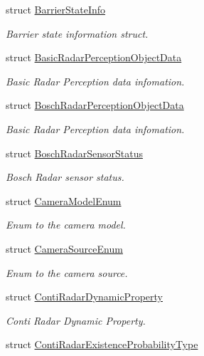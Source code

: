 \begin{DoxyCompactItemize}
struct \hyperlink{structmaf__perception__interface_1_1BarrierStateInfo}{Barrier\+State\+Info}
\begin{DoxyCompactList}\small\item\em Barrier state information struct. \end{DoxyCompactList}\item 
struct \hyperlink{structmaf__perception__interface_1_1BasicRadarPerceptionObjectData}{Basic\+Radar\+Perception\+Object\+Data}
\begin{DoxyCompactList}\small\item\em Basic Radar Perception data infomation. \end{DoxyCompactList}\item 
struct \hyperlink{structmaf__perception__interface_1_1BoschRadarPerceptionObjectData}{Bosch\+Radar\+Perception\+Object\+Data}
\begin{DoxyCompactList}\small\item\em Basic Radar Perception data infomation. \end{DoxyCompactList}\item 
struct \hyperlink{structmaf__perception__interface_1_1BoschRadarSensorStatus}{Bosch\+Radar\+Sensor\+Status}
\begin{DoxyCompactList}\small\item\em Bosch Radar sensor status. \end{DoxyCompactList}\item 
struct \hyperlink{structmaf__perception__interface_1_1CameraModelEnum}{Camera\+Model\+Enum}
\begin{DoxyCompactList}\small\item\em Enum to the camera model. \end{DoxyCompactList}\item 
struct \hyperlink{structmaf__perception__interface_1_1CameraSourceEnum}{Camera\+Source\+Enum}
\begin{DoxyCompactList}\small\item\em Enum to the camera source. \end{DoxyCompactList}\item 
struct \hyperlink{structmaf__perception__interface_1_1ContiRadarDynamicProperty}{Conti\+Radar\+Dynamic\+Property}
\begin{DoxyCompactList}\small\item\em Conti Radar Dynamic Property. \end{DoxyCompactList}\item 
struct \hyperlink{structmaf__perception__interface_1_1ContiRadarExistenceProbabilityType}{Conti\+Radar\+Existence\+Probability\+Type}

\end{DoxyCompactItemize}
